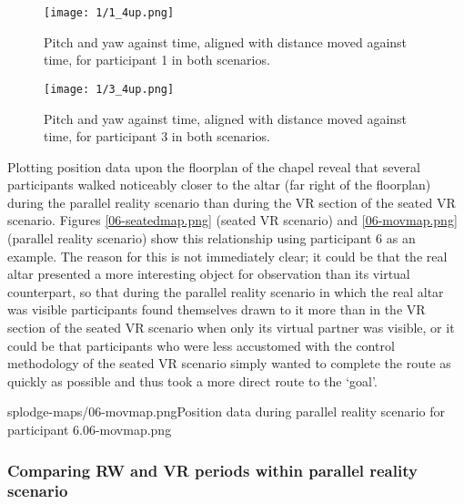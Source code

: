 \vspace{4cm}

\begin{figure}[h]
	\begin{center}
	\texttt{[image: 1/1\_4up.png]}
	\caption{Pitch and yaw against time, aligned with distance moved against time, for participant 1 in both scenarios.}
	\label{1_4up.png}
	\end{center}
\end{figure}

\begin{figure}
	\begin{center}
	\texttt{[image: 1/3\_4up.png]}
	\caption{Pitch and yaw against time, aligned with distance moved against time, for participant 3 in both scenarios.}
	\label{3_4up.png}
	\end{center}
\end{figure}


\clearpage

Plotting position data upon the floorplan of the chapel reveal that several participants walked noticeably closer to the altar (far right of the floorplan) during the parallel reality scenario than during the VR section of the seated VR scenario. Figures \ref{06-seatedmap.png} (seated VR scenario) and \ref{06-movmap.png} (parallel reality scenario) show this relationship using participant 6 as an example. The reason for this is not immediately clear; it could be that the real altar presented a more interesting object for observation than its virtual counterpart, so that during the parallel reality scenario in which the real altar was visible participants found themselves drawn to it more than in the VR section of the seated VR scenario when only its virtual partner was visible, or it could be that participants who were less accustomed with the control methodology of the seated VR scenario simply wanted to complete the route as quickly as possible and thus took a more direct route to the `goal'.

       {splodge-maps/06-movmap.png}{Position data during parallel reality scenario for participant 6.}{06-movmap.png}


\subsubsection{Comparing RW and VR periods within parallel reality scenario}

